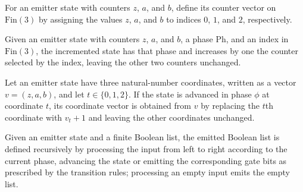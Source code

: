 \begin{definition}
\label{BoolCircuit.CktSatReduction.Emitter.ES.vec}
\leanok
{}
For an emitter state with counters $z$, $a$, and $b$, define its counter vector on $\mathrm{Fin}(3)$
by assigning the values $z$, $a$, and $b$ to indices $0$, $1$, and $2$, respectively.
\end{definition}

\begin{definition}
\label{BoolCircuit.CktSatReduction.Emitter.ES.incTo}
\leanok
{}
Given an emitter state with counters $z$, $a$, and $b$, a phase $\mathrm{Ph}$, and an index in
$\mathrm{Fin}(3)$, the incremented state has that phase and increases by one the counter selected by
the index, leaving the other two counters unchanged.
\end{definition}

\begin{theorem}
\label{BoolCircuit.CktSatReduction.Emitter.ES.vec_incTo}
\leanok
{}
Let an emitter state have three natural-number coordinates, written as a vector
$v=(z,a,b)$, and let $t\in\{0,1,2\}$. If the state is advanced in phase $\phi$ at
coordinate $t$, its coordinate vector is obtained from $v$ by replacing the $t$th
coordinate with $v_t+1$ and leaving the other coordinates unchanged.
\end{theorem}

\begin{definition}
\label{BoolCircuit.CktSatReduction.Emitter.emRun}
\leanok
{}
Given an emitter state and a finite Boolean list, the emitted Boolean list is defined
recursively by processing the input from left to right according to the current phase,
advancing the state or emitting the corresponding gate bits as prescribed by the
transition rules; processing an empty input emits the empty list.
\end{definition}

